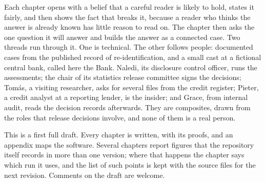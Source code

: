Each chapter opens with a belief that a careful reader is likely to hold, states it
fairly, and then shows the fact that breaks it, because a reader who thinks the answer
is already known has little reason to read on. The chapter then asks the one question
it will answer and builds the answer as a connected case. Two threads run through
it. One is technical. The other follows people: documented cases from the published
record of re-identification, and a small cast at a fictional central bank, called
here the Bank. Naledi, its disclosure control officer, runs the assessments; the
chair of its statistics release committee signs the decisions; Tomás, a visiting
researcher, asks for several files from the credit register; Pieter, a credit
analyst at a reporting lender, is the insider; and Grace, from internal audit, reads
the decision records afterwards. They are composites, drawn from the roles that
release decisions involve, and none of them is a real person.

This is a first full draft. Every chapter is written, with its proofs, and an appendix maps
the software. Several chapters report figures that the repository itself records in more than
one version; where that happens the chapter says which run it uses, and the list of such
points is kept with the source files for the next revision.
Comments on the draft are welcome.
